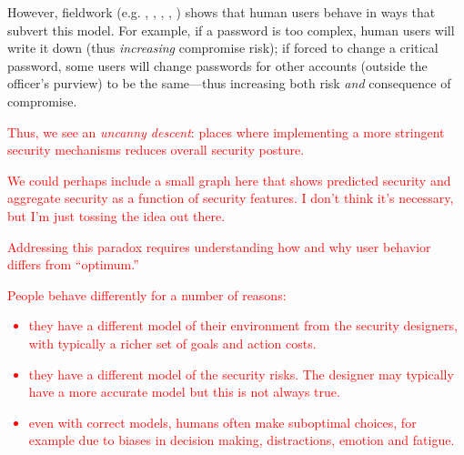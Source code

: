 \documentclass{acm_proc_article-sp}
\newcommand{\ignore}[1] {}
\begin{document}
However, fieldwork (e.g. \cite{blythe2013circumvention}, \cite{DP00},
\cite{florencio2007large}, \cite{gaw2006password},
\cite{riley2006password}) shows that human users behave in ways that
subvert this model.  For example, if a password is too complex, human
users will write it down (thus {\em increasing} compromise risk); if
forced to change a critical password, some users will change passwords
for other accounts (outside the officer's purview) to be the
same---thus increasing both risk {\em and} consequence of compromise.

\textcolor{red}{Thus, we see an \textit{uncanny descent}: places where implementing a more 
stringent security mechanisms reduces overall security posture.}

\ignore{Thus, what seems to be a simple monotonic relationship may in fact harbor
what graphics specialists call {\em uncanny valleys}: places where
dialing up the controls actually decreases overall security posture.}

\textcolor{red}{We could perhaps include a small graph here that shows 
predicted security and aggregate security as a function of security features. 
I don't think it's necessary, but I'm just tossing the idea out there.}

\textcolor{red}{Addressing this paradox requires understanding how and why user behavior
differs from ``optimum.''}

\textcolor{red}{
People behave differently for a number of reasons: 
\begin{itemize}
\item they have a
different model of their environment from the security designers, with
typically a richer set of goals and action costs.
\item they have a
different model of the security risks. The designer may typically have
a more accurate model but this is not always true.
\item even with
correct models, humans often make suboptimal choices, for example due
to biases in decision making, distractions, emotion and fatigue.
\end{itemize}
}
\end{document}
